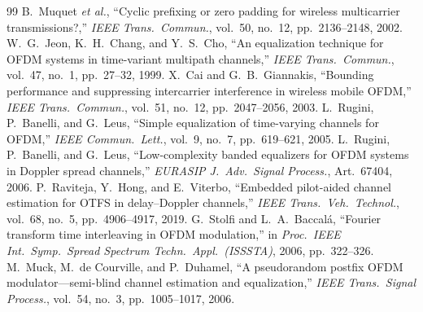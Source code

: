 \documentclass[onecolumn,journal]{IEEEtran}
\theoremstyle{bfhead}
\begin{document}
\begin{thebibliography}{99}
 B.~Muquet \emph{et al.}, ``Cyclic prefixing or zero padding
for wireless multicarrier transmissions?,'' \emph{IEEE Trans.\ Commun.},
vol.~50, no.~12, pp.~2136--2148, 2002.
 W.~G.~Jeon, K.~H.~Chang, and Y.~S.~Cho, ``An equalization
technique for OFDM systems in time-variant multipath channels,'' \emph{IEEE
Trans.\ Commun.}, vol.~47, no.~1, pp.~27--32, 1999.
 X.~Cai and G.~B.~Giannakis, ``Bounding performance and
suppressing intercarrier interference in wireless mobile OFDM,'' \emph{IEEE
Trans.\ Commun.}, vol.~51, no.~12, pp.~2047--2056, 2003.
 L.~Rugini, P.~Banelli, and G.~Leus, ``Simple equalization
of time-varying channels for OFDM,'' \emph{IEEE Commun.\ Lett.}, vol.~9, no.~7,
pp.~619--621, 2005.
 L.~Rugini, P.~Banelli, and G.~Leus, ``Low-complexity banded
equalizers for OFDM systems in Doppler spread channels,'' \emph{EURASIP J.\ Adv.\
Signal Process.}, Art.\ 67404, 2006.
 P.~Raviteja, Y.~Hong, and E.~Viterbo, ``Embedded
pilot-aided channel estimation for OTFS in delay--Doppler channels,'' \emph{IEEE
Trans.\ Veh.\ Technol.}, vol.~68, no.~5, pp.~4906--4917, 2019.
 G.~Stolfi and L.~A.~Baccal\'a, ``Fourier transform time
interleaving in OFDM modulation,'' in \emph{Proc.\ IEEE Int.\ Symp.\ Spread
Spectrum Techn.\ Appl.\ (ISSSTA)}, 2006, pp.~322--326.
 M.~Muck, M.~de Courville, and P.~Duhamel, ``A pseudorandom
postfix OFDM modulator---semi-blind channel estimation and equalization,''
\emph{IEEE Trans.\ Signal Process.}, vol.~54, no.~3, pp.~1005--1017, 2006.
\end{thebibliography}
\end{document}
